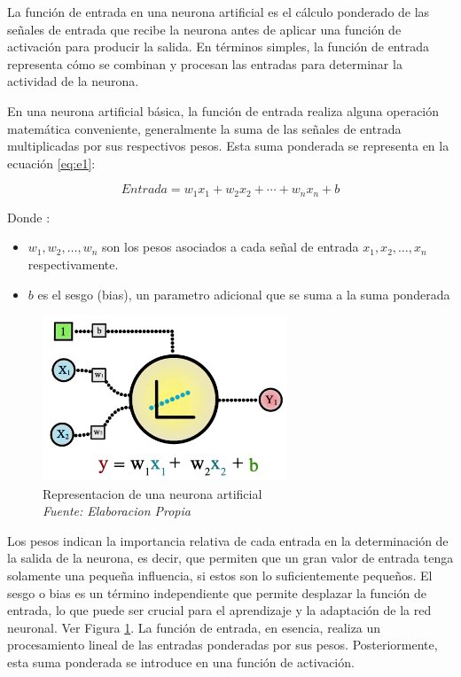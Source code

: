 La función de entrada en una neurona artificial es el cálculo ponderado de las señales de entrada que recibe la neurona antes de aplicar una función de activación para producir la salida. En términos simples, la función de entrada representa cómo se combinan y procesan las entradas para determinar la actividad de la neurona.

En una neurona artificial básica, la función de entrada realiza alguna operación matemática conveniente, generalmente la suma de las señales de entrada multiplicadas por sus respectivos pesos. Esta suma ponderada se representa en la ecuación \ref{eq:e1}:

\begin{equation} \label{eq:e1} 
	Entrada = w_1x_1 + w_2x_2 + \cdots + w_nx_n + b 
\end{equation}

Donde : 
\begin{itemize}
\item $w_1, w_2, \ldots, w_n$ son los pesos asociados a cada señal de entrada $x_1, x_2, \ldots, x_n$ respectivamente.
\item $b$ es el sesgo (bias), un parametro adicional que se suma a la suma ponderada
\end{itemize}

\begin{figure}[h!]
	\includegraphics[width=0.65\textwidth]{capitulo2/figuras/an6.png}
	\caption[Representacion de una neurona artificial]{Representacion de una neurona artificial
		\\\textit{Fuente: Elaboracion Propia}}
	\label{fig:an6}
\end{figure}

Los pesos indican la importancia relativa de cada entrada en la determinación de la salida de la neurona, es decir, que permiten que un gran valor de entrada tenga solamente una pequeña influencia, si estos son lo suficientemente pequeños. El sesgo o bias es un término independiente que permite desplazar la función de entrada, lo que puede ser crucial para el aprendizaje y la adaptación de la red neuronal. Ver Figura \ref{fig:an6}. La función de entrada, en esencia, realiza un procesamiento lineal de las entradas ponderadas por sus pesos. Posteriormente, esta suma ponderada se introduce en una función de activación.

